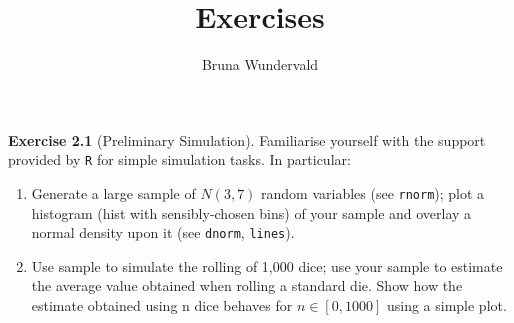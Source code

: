 \documentclass[]{article}
\title{Exercises}
\author{Bruna Wundervald}
\date{}
\newenvironment{Shaded}{\begin{snugshade}}{\end{snugshade}}
\newcommand{\CommentTok}[1]{\textcolor[rgb]{0.56,0.35,0.01}{\textit{#1}}}
\newcommand{\DataTypeTok}[1]{\textcolor[rgb]{0.13,0.29,0.53}{#1}}
\newcommand{\DecValTok}[1]{\textcolor[rgb]{0.00,0.00,0.81}{#1}}
\newcommand{\FloatTok}[1]{\textcolor[rgb]{0.00,0.00,0.81}{#1}}
\newcommand{\KeywordTok}[1]{\textcolor[rgb]{0.13,0.29,0.53}{\textbf{#1}}}
\newcommand{\NormalTok}[1]{#1}
\newcommand{\OperatorTok}[1]{\textcolor[rgb]{0.81,0.36,0.00}{\textbf{#1}}}
\newcommand{\StringTok}[1]{\textcolor[rgb]{0.31,0.60,0.02}{#1}}
\begin{document}
\maketitle

\textbf{Exercise 2.1} (Preliminary Simulation). Familiarise yourself
with the support provided by \texttt{R} for simple simulation tasks. In
particular:

\begin{enumerate}
\def\labelenumi{\arabic{enumi}.}
\item
  Generate a large sample of \(N(3,7)\) random variables (see
  \texttt{rnorm}); plot a histogram (hist with sensibly-chosen bins) of
  your sample and overlay a normal density upon it (see \texttt{dnorm},
  \texttt{lines}).
\item
  Use sample to simulate the rolling of 1,000 dice; use your sample to
  estimate the average value obtained when rolling a standard die. Show
  how the estimate obtained using n dice behaves for \(n \in [0, 1000]\)
  using a simple plot.
\end{enumerate}

\begin{Shaded}
\end{Shaded}
\end{document}
